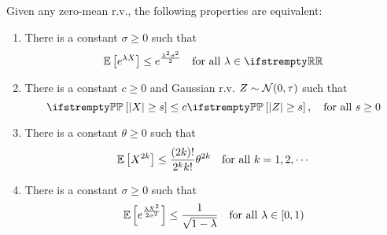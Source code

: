 \documentclass{paper}
\begin{document}
\begin{thm}
	Given any zero-mean r.v., the following properties are equivalent:
	\begin{enumerate}
		\item There is a constant $\sigma\geq 0$ such that
		      \[
			      \EE\left[e^{\lambda X}\right] \leq e^{\frac{\lambda^2\sigma^2}{2}} \quad \text{for all } \lambda\in \RR
		      \]
		\item There is a constant $c\geq 0$ and Gaussian r.v. $Z\sim\mathcal{N}(0, \tau)$ such that
		      \[
			      \PP\left[\vert X\vert\geq s\right]\leq c\PP\left[\vert Z\vert \geq s\right], \quad \text{for all } s\geq 0
		      \]
		\item There is a constant $\theta\geq 0$ such that
		      \[
			      \mathbb{E}\left[X^{2k}\right]\leq \frac{(2k)!}{2^k k!} \theta^{2k} \quad \text{for all } k=1, 2, \cdots
		      \]
		\item There is a constant $\sigma\geq 0$ such that
		      \[
			      \mathbb{E}\left[e^{\frac{\lambda X^2}{2\sigma^2}}\right]\leq \frac{1}{\sqrt{1-\lambda}} \quad\text{for all } \lambda \in [0, 1)
		      \]
	\end{enumerate}
\end{thm}
\end{document}
